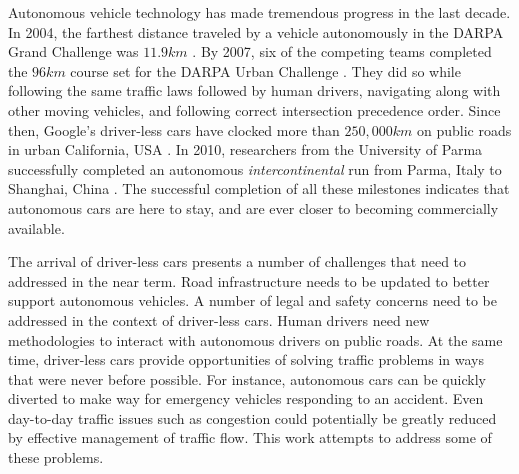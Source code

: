 \documentclass[letterpaper, 10 pt, conference]{ieeeconf}  %
\begin{document}
Autonomous vehicle technology has made tremendous progress in the last decade. In 2004, the farthest distance traveled by a vehicle autonomously in the DARPA Grand Challenge was $11.9km$ \cite{cnnGrandChallenge2004}. By 2007, six of the competing teams completed the $96km$ course set for the DARPA Urban Challenge \cite{spectrumUrbanChallenge2007}. They did so while following the same traffic laws followed by human drivers, navigating along with other moving vehicles, and following correct intersection precedence order. Since then, Google's driver-less cars have clocked more than $250,000km$ on public roads in urban California, USA \cite{tedThrun2011}. In 2010, researchers from the University of Parma successfully completed an autonomous \textit{intercontinental} run from Parma, Italy to Shanghai, China \cite{cnnVislab2010}. The successful completion of all these milestones indicates that autonomous cars are here to stay, and are ever closer to becoming commercially available. 

The arrival of driver-less cars presents a number of challenges that need to addressed in the near term. Road infrastructure needs to be updated to better support autonomous vehicles. A number of legal and safety concerns need to be addressed in the context of driver-less cars. Human drivers need new methodologies to interact with autonomous drivers on public roads. At the same time, driver-less cars provide opportunities of solving traffic problems in ways that were never before possible. For instance, autonomous cars can be quickly diverted to make way for emergency vehicles responding to an accident. Even day-to-day traffic issues such as congestion could potentially be greatly reduced by effective management of traffic flow. This work attempts to address some of these problems.

\end{document}
